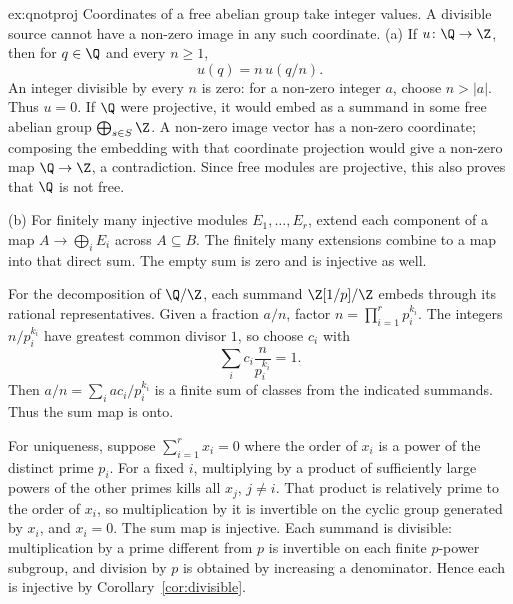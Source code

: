 \begin{solution}{ex:qnotproj}
\idea Coordinates of a free abelian group take integer values. A divisible source cannot have a non-zero image in any such coordinate.
\writeup (a) If $u\colon\Q\to\Z$, then for $q\in\Q$ and every $n\ge1$,
\[
u(q)=n\,u(q/n).
\]
An integer divisible by every $n$ is zero: for a non-zero integer $a$, choose $n>|a|$. Thus $u=0$. If $\Q$ were projective, it would embed as a summand in some free abelian group $\bigoplus_{s\in S}\Z$. A non-zero image vector has a non-zero coordinate; composing the embedding with that coordinate projection would give a non-zero map $\Q\to\Z$, a contradiction. Since free modules are projective, this also proves that $\Q$ is not free.

(b) For finitely many injective modules $E_1,\ldots,E_r$, extend each component of a map $A\to\bigoplus_iE_i$ across $A\subseteq B$. The finitely many extensions combine to a map into that direct sum. The empty sum is zero and is injective as well.

For the decomposition of $\Q/\Z$, each summand $\Z[1/p]/\Z$ embeds through its rational representatives. Given a fraction $a/n$, factor $n=\prod_{i=1}^r p_i^{k_i}$. The integers $n/p_i^{k_i}$ have greatest common divisor $1$, so choose $c_i$ with
\[
\sum_i c_i\frac{n}{p_i^{k_i}}=1.
\]
Then $a/n=\sum_i ac_i/p_i^{k_i}$ is a finite sum of classes from the indicated summands. Thus the sum map is onto.

For uniqueness, suppose $\sum_{i=1}^r x_i=0$ where the order of $x_i$ is a power of the distinct prime $p_i$. For a fixed $i$, multiplying by a product of sufficiently large powers of the other primes kills all $x_j$, $j\ne i$. That product is relatively prime to the order of $x_i$, so multiplication by it is invertible on the cyclic group generated by $x_i$, and $x_i=0$. The sum map is injective. Each summand is divisible: multiplication by a prime different from $p$ is invertible on each finite $p$-power subgroup, and division by $p$ is obtained by increasing a denominator. Hence each is injective by Corollary~\ref{cor:divisible}.
\end{solution}

